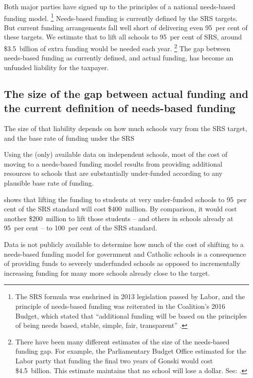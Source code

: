 \documentclass{grattan}
\begin{document}
Both major parties have signed up to the principles of a national needs-based funding model.%
\footnote{The SRS formula was enshrined in 2013 legislation passed by Labor, and the principle of needs-based funding was reiterated in the Coalition's 2016 Budget, which stated that ``additional funding will be based on the principles of being needs based, stable, simple, fair, transparent'' {\textcite[][No.~2, p.~80]{Treasury2016BudgetPapers2016}}.}
Needs-based funding is currently defined by the SRS targets. But current funding arrangements fall well short of delivering even 95~per cent of these targets. We estimate that to lift all schools to 95~per cent of SRS, around \$3.5~billion of extra funding would be needed each year.%
\footnote{There have been many different estimates of the size of the needs-based funding gap. For example, the Parliamentary Budget Office estimated for the Labor party that funding the final two years of Gonski would cost \$4.5~billion.
This estimate maintains that no school will lose a dollar. See:
\textcite{PBO2016PostElectionReport}.}
The gap between needs-based funding as currently defined, and actual funding, has become an unfunded liability for the taxpayer.

\subsection{The size of the gap between actual funding and the current definition of needs-based funding }\label{subsec:siz-of-the-gap-between-actual-funding-and-the-current-definition}

The size of that liability depends on how much schools vary from the SRS target, and the base rate of funding under the SRS

Using the (only) available data on independent schools, most of the cost of moving to a needs-based funding model results from providing additional resources to schools that are substantially under-funded according to any plausible base rate of funding.

 shows that lifting the funding to students at very under-funded schools to 95~per cent of the SRS standard will cost \$400~million.
By comparison, it would cost another \$200~million to lift those students -- and others in schools already at 95~per cent -- to 100~per cent of the SRS standard.

Data is not publicly available to determine how much of the cost of shifting to a needs-based funding model for government and Catholic schools is a consequence of providing funds to severely underfunded schools as opposed to incrementally increasing funding for many more schools already close to the target.
\end{document}
